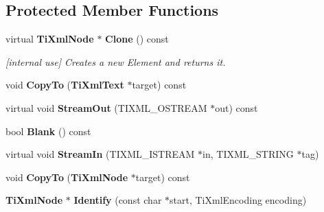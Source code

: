 \subsection*{Protected Member Functions}
\begin{CompactItemize}
\item 
virtual {\bf Ti\-Xml\-Node} $\ast$ {\bf Clone} () const\label{classTiXmlText_TiXmlTextb0}

\begin{CompactList}\small\item\em [internal use] Creates a new Element and returns it. \item\end{CompactList}\item 
void {\bf Copy\-To} ({\bf Ti\-Xml\-Text} $\ast$target) const\label{classTiXmlText_TiXmlTextb1}

\item 
virtual void {\bf Stream\-Out} (TIXML\_\-OSTREAM $\ast$out) const\label{classTiXmlText_TiXmlTextb2}

\item 
bool {\bf Blank} () const\label{classTiXmlText_TiXmlTextb3}

\item 
virtual void {\bf Stream\-In} (TIXML\_\-ISTREAM $\ast$in, TIXML\_\-STRING $\ast$tag)\label{classTiXmlText_TiXmlTextb4}

\item 
void {\bf Copy\-To} ({\bf Ti\-Xml\-Node} $\ast$target) const\label{classTiXmlNode_TiXmlUnknownb3}

\item 
{\bf Ti\-Xml\-Node} $\ast$ {\bf Identify} (const char $\ast$start, Ti\-Xml\-Encoding encoding)\label{classTiXmlNode_TiXmlUnknownb4}

\end{CompactItemize}
